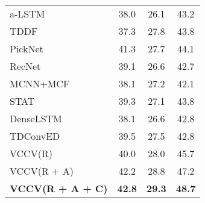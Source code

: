 \documentclass[a4paper,conference]{IEEEtran}
\begin{document}
\begin{table}[!h]
\begin{tabular}{l|c|c|c}
a-LSTM~\cite{gao2017video} &38.0 &26.1 &43.2 \\
TDDF~\cite{zhang2017task} &37.3 &27.8 &43.8 \\
PickNet~\cite{chen2018less} &41.3 &27.7 &44.1 \\
RecNet~\cite{wang2018reconstruction} &39.1 &26.6 & 42.7 \\
MCNN+MCF~\cite{wu2018multi} &38.1 &27.2 &42.1 \\
STAT~\cite{yan2019stat} &39.3 &27.1 &43.8 \\
DenseLSTM~\cite{zhu2019attention} &38.1 &26.6 &42.8 \\
TDConvED~\cite{chen2019temporal} &39.5 &27.5 &42.8 \\

\hline
{VCCV(R)} & {40.0} & {28.0} & {45.7} \\
{VCCV(R + A)}  &{42.2} & {28.8} & {47.2} \\
\textbf{VCCV(R + A + C)}  &\textbf{42.8} & \textbf{29.3} & \textbf{48.7} \\

\hline
\end{tabular}

\label{tab:msr-vtt}
\end{table}

\vspace{0.1cm}
\end{document}
